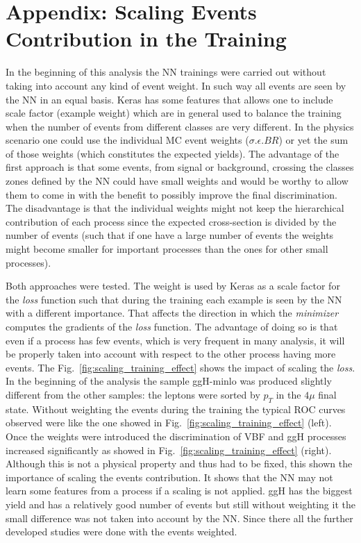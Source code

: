 \documentclass[]{report}
\begin{document}
\section{Appendix: Scaling Events Contribution in the Training}
In the beginning of this analysis the NN trainings were carried out without taking into account any kind of event weight. In such way all events are seen by the NN in an equal basis. Keras has some features that allows one to include scale factor (example weight) which are in general used to balance the training when the number of events from different classes are very different. In the physics scenario one could use the individual MC event weights ($\sigma.\epsilon.BR$) or yet the sum of those weights (which constitutes the expected yields). The advantage of the first approach is that some events, from signal or background, crossing the classes zones defined by the NN could have small weights and would be worthy to allow them to come in with the benefit to possibly improve  the final discrimination. The disadvantage is that the individual weights might not keep the hierarchical contribution of each process since the expected cross-section is divided by the number of events (such that if one have a large number of events the weights might become smaller for important processes than the ones for other small processes).

Both approaches were tested. The weight is used by Keras as a scale factor for the \textit{loss} function such that during the training each example is seen by the NN with a different importance. That affects the direction in which the \textit{minimizer} computes the gradients of the \textit{loss} function. The advantage of doing so is that even if a process has few events, which is very frequent in many analysis, it will be properly taken into account with respect to the other process having more events. The Fig.~\ref{fig:scaling_training_effect} shows the impact of scaling the \textit{loss}. In the beginning of the analysis the sample ggH-minlo was produced slightly different from the other samples: the leptons were sorted by $p_{T}$ in the $4\mu$ final state. Without weighting the events during the training the typical ROC curves observed were like the one showed in Fig.~\ref{fig:scaling_training_effect} (left). Once the weights were introduced the discrimination of VBF and ggH processes increased significantly as showed in Fig.~\ref{fig:scaling_training_effect} (right). Although this is not a physical property and thus had to be fixed, this shown the importance of scaling the events contribution. It shows that the NN may not learn some features from a process if a scaling is not applied. ggH has the biggest yield and has a relatively good number of events but still without weighting it the small difference was not taken into account by the NN. Since there all the further developed studies were done with the events weighted.
\end{document}
